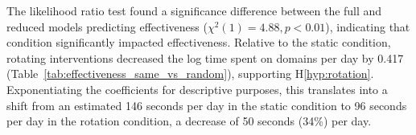 The likelihood ratio test found a significance difference between the full and reduced models predicting effectiveness ($\chi^{2}(1) = 4.88, p < 0.01$), indicating that condition significantly impacted effectiveness. Relative to the static condition, rotating interventions decreased the log time spent on domains per day by 0.417 (Table~\ref{tab:effectiveness_same_vs_random}), supporting H\ref*{hyp:rotation}. Exponentiating the coefficients for descriptive purposes, this translates into a shift from an estimated 146 seconds per day in the static condition to 96 seconds per day in the rotation condition, a decrease of 50 seconds (34\%) per day.




